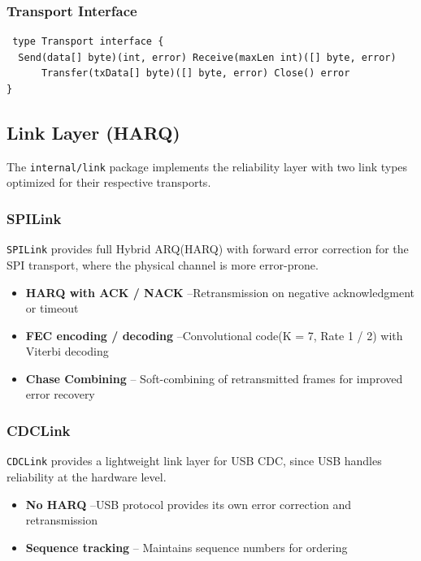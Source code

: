 \subsubsection{Transport Interface}

\begin{verbatim} type Transport interface {
  Send(data[] byte)(int, error) Receive(maxLen int)([] byte, error)
      Transfer(txData[] byte)([] byte, error) Close() error
}
\end{verbatim}

\subsection{Link Layer (HARQ)}

The \texttt{internal/link} package implements the reliability layer with two link types optimized for their respective transports.

\subsubsection{SPILink
}

\texttt{SPILink} provides full Hybrid ARQ(HARQ) with forward error correction for the SPI transport, where the physical channel is more error-prone.

\begin{itemize}[leftmargin=1.5em,topsep=4pt,itemsep=2pt]
    \item \textbf{HARQ with ACK / NACK
}
--Retransmission on negative acknowledgment or timeout
    \item \textbf{FEC encoding / decoding
}
--Convolutional code(K = 7, Rate 1 / 2) with Viterbi decoding
    \item \textbf{Chase Combining
} -- Soft-combining of retransmitted frames for improved error recovery
\end{itemize}

\subsubsection{CDCLink}

\texttt{CDCLink} provides a lightweight link layer for USB CDC, since USB handles reliability at the hardware level.

\begin{itemize}[leftmargin=1.5em,topsep=4pt,itemsep=2pt]
    \item \textbf{No HARQ
}
--USB protocol provides its own error correction and retransmission
    \item \textbf{Sequence tracking
} -- Maintains sequence numbers for ordering
\end{itemize}

